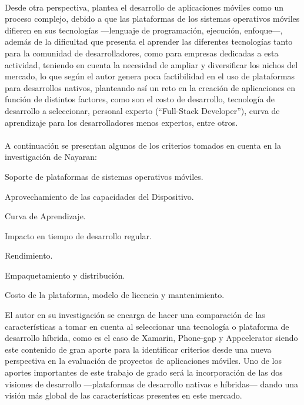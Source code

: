 \\
Desde otra perspectiva, \citet{Narayan2014Mobile} plantea el desarrollo de aplicaciones móviles como un proceso complejo, debido a que las plataformas de los sistemas operativos móviles difieren en sus tecnologías ---lenguaje de programación, ejecución, enfoque---, además de la dificultad que presenta el aprender las diferentes tecnologías tanto para la comunidad de desarrolladores, como para empresas dedicadas a esta actividad, teniendo en cuenta la necesidad de ampliar y diversificar los nichos del mercado, lo que según el autor genera poca factibilidad en el uso de plataformas para desarrollos nativos, planteando así un reto en la creación de aplicaciones en función de distintos factores, como son el costo de desarrollo, tecnología de desarrollo a seleccionar, personal experto (``Full-Stack Developer''), curva de aprendizaje para los desarrolladores menos expertos, entre otros.\\
\\
A continuación se presentan algunos de los criterios tomados en cuenta en la investigación de Nayaran:
\\
\begin{viñetas}
\item Soporte de plataformas de sistemas operativos móviles.
\item Aprovechamiento de las capacidades del Dispositivo.
\item Curva de Aprendizaje.
\item Impacto en tiempo de desarrollo regular.
\item Rendimiento.
\item Empaquetamiento y distribución.
\item Costo de la plataforma, modelo de licencia y mantenimiento.
\\
\end{viñetas}
El autor en su investigación se encarga de hacer una comparación de las características a tomar en cuenta al seleccionar una tecnología o plataforma de desarrollo híbrida, como es el caso de Xamarin, Phone-gap y Appcelerator  siendo este contenido de gran aporte para la identificar criterios desde una nueva perspectiva en la evaluación de proyectos de aplicaciones móviles. Uno de los aportes importantes de este trabajo de grado será la incorporación de las dos visiones de desarrollo ---plataformas de desarrollo nativas e híbridas--- dando una visión más global de las características presentes en este mercado.\\
\\
